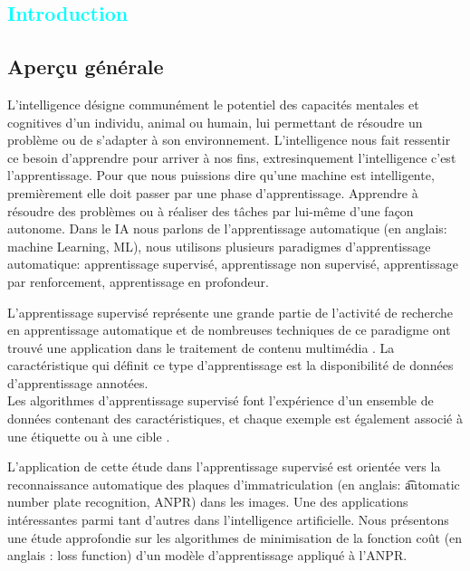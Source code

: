 

\textcolor{cyan}{\chapter{Introduction}}
	\section{ Aperçu générale}
	
		L’intelligence désigne communément le potentiel des capacités mentales et cognitives d'un individu, animal ou humain, lui permettant de résoudre un problème ou de s'adapter à son environnement. L'intelligence nous fait ressentir ce besoin d’apprendre pour arriver à nos fins, extresinquement l'intelligence c’est l'apprentissage. Pour que nous puissions dire qu’une machine est intelligente, premièrement elle doit passer par une phase d'apprentissage.  Apprendre à résoudre des problèmes ou à réaliser des tâches par lui-même d’une façon autonome. Dans le IA nous parlons de l’apprentissage automatique (en anglais: machine Learning, ML), nous utilisons plusieurs paradigmes d’apprentissage automatique:  apprentissage supervisé, apprentissage non supervisé, apprentissage par renforcement, apprentissage en profondeur.
		
		L'apprentissage supervisé représente une grande partie de l'activité de recherche en apprentissage automatique et de nombreuses techniques de ce paradigme ont trouvé une application dans le traitement de contenu multimédia \cite{cunningham2008supervised}. La caractéristique qui définit ce type d’apprentissage est la disponibilité de données d'apprentissage annotées.\\ Les algorithmes d'apprentissage supervisé font l'expérience d'un ensemble de données contenant des caractéristiques, et chaque exemple est également associé à une étiquette ou à une cible \cite{goodfellow2016deep}. 
		
		L’application de cette étude dans l’apprentissage supervisé est orientée vers la reconnaissance automatique des plaques d’immatriculation (en anglais: \t{automatic number plate recognition, ANPR}) dans les images. Une des applications intéressantes parmi tant d'autres dans l'intelligence artificielle. Nous présentons une étude approfondie sur les algorithmes de minimisation de la fonction coût (en anglais : loss function) d’un modèle d’apprentissage appliqué à l'ANPR. 
		
